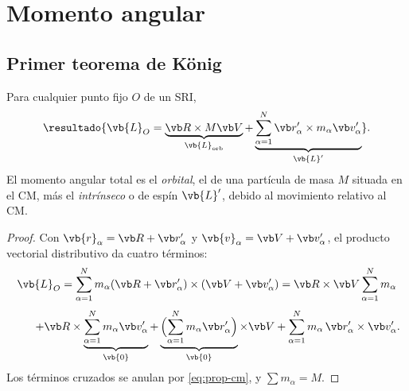 \section{Momento angular}
\label{sec:momento-angular}

\subsection{Primer teorema de König}

\begin{teorema}
\label{teo:konig1}
Para cualquier punto fijo $O$ de un SRI,
\begin{equation}
  \resultado{\vb{L}_{O}=\underbrace{\Rc\times M\Vc}_{\vb{L}_{\text{orb}}}
  +\underbrace{\sa\rp_{\alpha}\times m_{\alpha}\vp_{\alpha}}_{\vb{L}'}} .
  \label{eq:konig1}
\end{equation}
El momento angular total es el \emph{orbital}, el de una partícula de masa
$M$ situada en el CM, más el \emph{intrínseco} o de espín $\vb{L}'$, debido al
movimiento relativo al CM.
\end{teorema}

\begin{proof}
Con $\vb{r}_{\alpha}=\Rc+\rp_{\alpha}$ y $\vb{v}_{\alpha}=\Vc+\vp_{\alpha}$, el producto vectorial
distributivo da cuatro términos:
\[
  \vb{L}_{O}=\sa m_{\alpha}(\Rc+\rp_{\alpha})\times(\Vc+\vp_{\alpha})
  =\Rc\times\Vc\sa m_{\alpha}
\]
\[
  \qquad+\Rc\times\underbrace{\sa m_{\alpha}\vp_{\alpha}}_{\vb{0}}
  +\underbrace{\Bigl(\sa m_{\alpha}\rp_{\alpha}\Bigr)}_{\vb{0}}\times\Vc
  +\sa m_{\alpha}\,\rp_{\alpha}\times\vp_{\alpha}.
\]
Los términos cruzados se anulan por \eqref{eq:prop-cm}, y $\sum m_{\alpha}=M$.
\end{proof}

